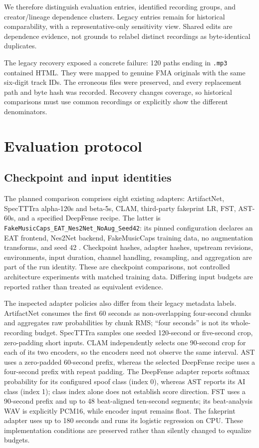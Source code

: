\documentclass[10pt,a4paper]{article}
\begin{document}
We therefore distinguish \BenchEntries{} evaluation entries, \RecordingGroups{}
identified recording groups, and \DependenceClusters{} creator/lineage dependence
clusters. Legacy entries remain for historical comparability, with a
representative-only sensitivity view. Shared edits are dependence evidence,
not grounds to relabel distinct recordings as byte-identical duplicates.

The legacy recovery exposed a concrete failure: 120 paths ending in
\texttt{.mp3} contained HTML. They were mapped to genuine FMA originals with
the same six-digit track IDs. The erroneous files were preserved, and every
replacement path and byte hash was recorded. Recovery changes coverage, so
historical comparisons must use common recordings or explicitly show the
different denominators.

\section{Evaluation protocol}

\subsection{Checkpoint and input identities}
The planned comparison comprises eight existing adapters: ArtifactNet,
SpecTTTra alpha-120s and beta-5s, CLAM, third-party fakeprint LR, FST, AST-60s,
and a specified DeepFense recipe. The latter is
\texttt{FakeMusicCaps\_EAT\_Nes2Net\_NoAug\_Seed42}: its pinned configuration
declares an EAT frontend, Nes2Net backend, FakeMusicCaps training data, no
augmentation transforms, and seed 42 \citep{deepfense_recipe}.
Checkpoint hashes, adapter hashes, upstream
revisions, environments, input duration, channel handling, resampling, and
aggregation are part of the run identity. These are checkpoint comparisons,
not controlled architecture experiments with matched training data. Differing
input budgets are reported rather than treated as equivalent evidence.

The inspected adapter policies also differ from their legacy metadata labels.
ArtifactNet consumes the first 60 seconds as non-overlapping four-second chunks
and aggregates raw probabilities by chunk RMS; ``four seconds'' is not its
whole-recording budget. SpecTTTra samples one seeded 120-second or five-second
crop, zero-padding short inputs. CLAM independently selects one 90-second crop
for each of its two encoders, so the encoders need not observe the same interval.
AST uses a zero-padded 60-second prefix, whereas the selected DeepFense recipe
uses a four-second prefix with repeat padding. The DeepFense adapter reports
softmax probability for its configured spoof class (index 0), whereas AST
reports its AI class (index 1); class index alone does not establish score
direction. FST uses a 90-second prefix and
up to 48 beat-aligned ten-second segments; its beat-analysis WAV is explicitly
PCM16, while encoder input remains float. The fakeprint adapter uses up to
180 seconds and runs its logistic regression on CPU. These implementation
conditions are preserved rather than silently changed to equalize budgets.
\end{document}

